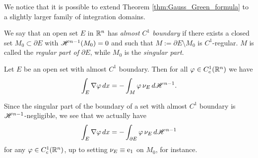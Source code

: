 We notice that it is possible to extend Theorem \ref{thm:Gauss_Green_formula} to a slightly larger family of integration domains.

\begin{definition}
We say that an open set $E$ in $\mathbb{R}^{n}$ has {\em almost $C^{1}$ boundary} if there exists a closed set $M_{0} \subset \partial E$ with $\mathscr{H}^{n - 1}(M_{0}) = 0$ and such that $M:= \partial E \setminus M_{0}$ is $C^{1}$-regular. $M$ is called the {\em regular part of $\partial E$}, while $M_{0}$ is the {\em singular part}.
\end{definition}

\begin{theorem} \label{thm:Gauss_Green_almost_C_1}
Let $E$ be an open set with almost $C^{1}$ boundary. Then for all $\varphi \in C^{1}_{c}(\mathbb{R}^{n})$ we have
\begin{equation*}
\int_{E} \nabla \varphi \,dx = - \int_{M} \varphi \, \nu_{E} \, d \mathscr{H}^{n - 1}.
\end{equation*}
\end{theorem}

\begin{remark}
Since the singular part of the boundary of a set with almost $C^1$ boundary is $\mathscr{H}^{n - 1}$-negligible, we see that we actually have
\begin{equation*}
\int_{E} \nabla \varphi \,dx = - \int_{\partial E} \varphi \, \nu_{E} \, d \mathscr{H}^{n - 1}
\end{equation*}
for any $\varphi \in C^{1}_{c}(\mathbb{R}^{n})$, up to setting $\nu_{E} \equiv {\rm e}_{1}$ on $M_{0}$, for instance.
\end{remark}







